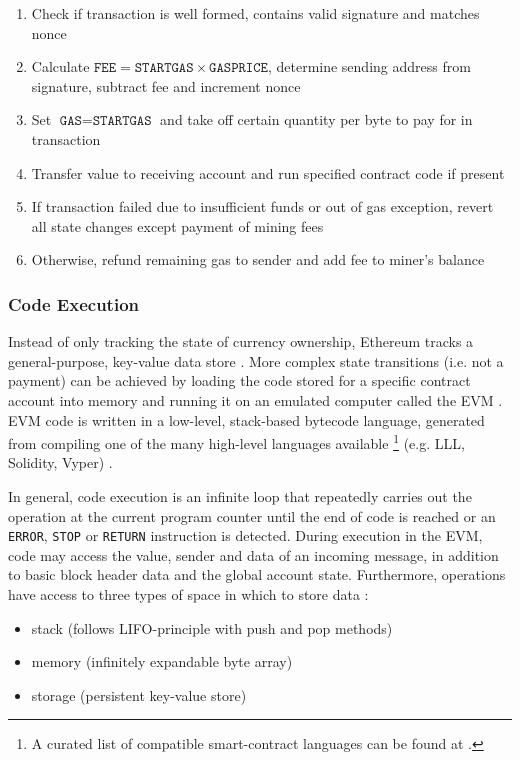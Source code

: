 \begin{enumerate}
  \item Check if transaction is well formed, contains valid signature and matches nonce
  \item Calculate $\texttt{FEE} = \texttt{STARTGAS} \times \texttt{GASPRICE}$, determine sending address from signature, subtract fee and increment nonce
  \item Set $\texttt{GAS} = \texttt{STARTGAS}$ and take off certain quantity per byte to pay for in transaction
  \item Transfer value to receiving account and run specified contract code if present
  \item If transaction failed due to insufficient funds or out of gas exception, revert all state changes except payment of mining fees
  \item Otherwise, refund remaining gas to sender and add fee to miner's balance
\end{enumerate}

\subsubsection{Code Execution}
Instead of only tracking the state of currency ownership, Ethereum tracks a general-purpose, key-value data store \cite[p.~28]{Antonopoulos.2018}. More complex state transitions (i.e. not a payment) can be achieved by loading the code stored for a specific contract account into memory and running it on an emulated computer called the \ac{EVM} \cite[p.~57]{Antonopoulos.2018}. \ac{EVM} code is written in a low-level, stack-based bytecode language, generated from compiling one of the many high-level languages available \footnote{A curated list of compatible smart-contract languages can be found at \cite{smartContractLanguages}.} (e.g. LLL, Solidity, Vyper) \cite[p.~22]{ethereumWhitepaperGitHub} \cite[p.~29]{Antonopoulos.2018}. 

In general, code execution is an infinite loop that repeatedly carries out the operation at the current program counter until the end of code is reached or an \texttt{ERROR}, \texttt{STOP} or \texttt{RETURN} instruction is detected. During execution in the \ac{EVM}, code may access the value, sender and data of an incoming message, in addition to basic block header data and the global account state. Furthermore, operations have access to three types of space in which to store data \cite[p.~22]{ethereumWhitepaperGitHub}:

\begin{itemize}
  \item stack (follows LIFO-principle with push and pop methods)
  \item memory (infinitely expandable byte array)
  \item storage (persistent key-value store)
\end{itemize}

